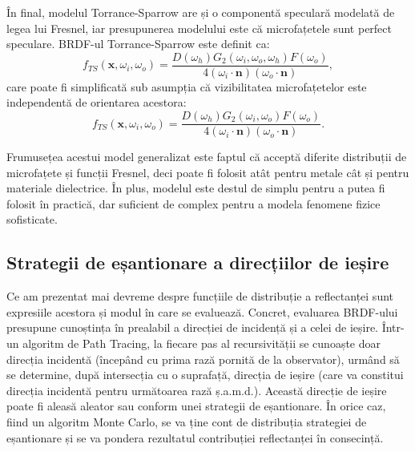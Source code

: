\documentclass[12pt,a4paper]{report}
\numberwithin{equation}{section} %
\begin{document}
În final, modelul Torrance-Sparrow are și o componentă speculară modelată de legea
lui Fresnel, iar presupunerea modelului este că microfațetele sunt perfect speculare.
BRDF-ul Torrance-Sparrow este definit ca:
\begin{equation}
	f_{TS}(\mathbf{x}, \omega_i, \omega_o) = \frac{D(\omega_h)G_2(\omega_i, \omega_o, \omega_h)F(\omega_o)}{4(\omega_i \cdot \mathbf{n})(\omega_o \cdot \mathbf{n})},
\end{equation}
care poate fi simplificată sub asumpția că vizibilitatea microfațetelor este independentă
de orientarea acestora:
\begin{equation}\label{eq:ts}
	f_{TS}(\mathbf{x}, \omega_i, \omega_o) = \frac{D(\omega_h)G_2(\omega_i, \omega_o)F(\omega_o)}{4(\omega_i \cdot \mathbf{n})(\omega_o \cdot \mathbf{n})}.
\end{equation}

Frumusețea acestui model generalizat este faptul că acceptă diferite distribuții
de microfațete și funcții Fresnel, deci poate fi folosit atât pentru metale cât
și pentru materiale dielectrice. În plus, modelul este destul de simplu pentru a
putea fi folosit în practică, dar suficient de complex pentru a modela fenomene
fizice sofisticate.

\subsection{Strategii de eșantionare a direcțiilor de ieșire}

Ce am prezentat mai devreme despre funcțiile de distribuție a reflectanței
sunt expresiile acestora și modul în care se evaluează. Concret, evaluarea
BRDF-ului presupune cunoștința în prealabil a direcției de incidență și a celei
de ieșire. Într-un algoritm de Path Tracing, la fiecare pas al recursivității
se cunoaște doar direcția incidentă (începând cu prima rază pornită de la observator),
urmând să se determine, după intersecția cu o suprafață, direcția de ieșire (care
va constitui direcția incidentă pentru următoarea rază ș.a.m.d.). Această
direcție de ieșire poate fi aleasă aleator sau conform unei strategii de eșantionare.
În orice caz, fiind un algoritm Monte Carlo, se va ține cont de distribuția strategiei
de eșantionare și se va pondera rezultatul contribuției reflectanței în consecință.
\end{document}
